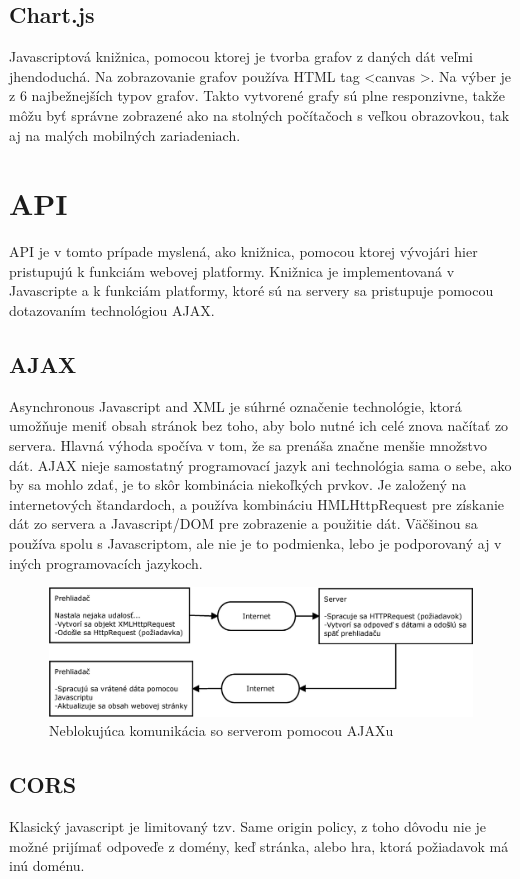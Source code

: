 \subsection{Chart.js}
Javascriptová knižnica, pomocou ktorej je tvorba grafov z daných dát veľmi jhendoduchá. Na zobrazovanie grafov používa HTML tag <canvas >. Na výber je z 6 najbežnejších typov grafov. Takto vytvorené grafy sú plne responzivne, takže môžu byť správne zobrazené ako na stolných počítačoch s veľkou obrazovkou, tak aj na malých mobilných zariadeniach.

\section{API}
API je v tomto prípade myslená, ako knižnica, pomocou ktorej vývojári hier pristupujú k funkciám webovej platformy. Knižnica je implementovaná v Javascripte a k funkciám platformy, ktoré sú na servery sa pristupuje pomocou dotazovaním technológiou AJAX.

\subsection{AJAX}
Asynchronous Javascript and XML je súhrné označenie technológie, ktorá umožňuje meniť obsah stránok bez toho, aby bolo nutné ich celé znova načítať zo servera. Hlavná výhoda spočíva v tom, že sa prenáša značne menšie množstvo dát. AJAX nieje samostatný programovací jazyk ani technológia sama o sebe, ako by sa mohlo zdať, je to skôr kombinácia niekoľkých prvkov. Je založený na internetových štandardoch, a používa kombináciu HMLHttpRequest pre získanie dát zo servera a Javascript/DOM pre zobrazenie a použitie dát. Väčšinou sa používa spolu s Javascriptom, ale nie je to podmienka, lebo je podporovaný aj v iných programovacích jazykoch.  
\begin{figure}[h]
  \centering
  \includegraphics[scale=0.35]{fig/ajax.eps}
  \caption{Neblokujúca komunikácia so serverom pomocou AJAXu}
  \label{fig:ajax}
\end{figure}

\subsection{CORS}
Klasický javascript je limitovaný tzv. Same origin policy, z toho dôvodu nie je možné prijímať odpoveďe z domény, keď stránka, alebo hra, ktorá požiadavok má inú doménu. 

